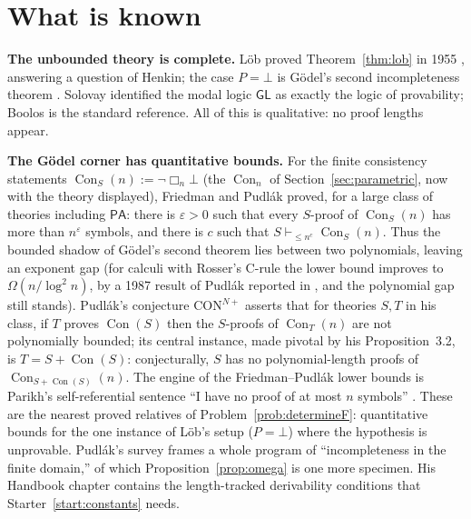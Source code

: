 \documentclass[11pt]{amsart}
\theoremstyle{plain}
\theoremstyle{definition}
\newcommand{\PA}{\mathsf{PA}}
\newcommand{\GL}{\mathsf{GL}}
\newcommand{\Con}{\operatorname{Con}}
\begin{document}
\section{What is known}
\label{sec:known}

\textbf{The unbounded theory is complete.} L\"ob proved Theorem~\ref{thm:lob} in 1955 \cite{lob1955}, answering a question of Henkin; the case $P = \bot$ is G\"odel's second incompleteness theorem \cite{godel1931}. Solovay \cite{solovay1976} identified the modal logic $\GL$ as exactly the logic of provability; Boolos \cite{boolos1993} is the standard reference. All of this is qualitative: no proof lengths appear.

\textbf{The G\"odel corner has quantitative bounds.} For the finite consistency statements $\Con_S(n) := \neg\Box_n\bot$ (the $\Con_n$ of Section~\ref{sec:parametric}, now with the theory displayed), Friedman \cite{friedman1979} and Pudl\'ak \cite{pudlak1986} proved, for a large class of theories including $\PA$: there is $\varepsilon > 0$ such that every $S$-proof of $\Con_S(n)$ has more than $n^{\varepsilon}$ symbols, and there is $c$ such that $S \vdash_{\le n^c} \Con_S(n)$. Thus the bounded shadow of G\"odel's second theorem lies between two polynomials, leaving an exponent gap (for calculi with Rosser's C-rule the lower bound improves to $\Omega(n/\log^2 n)$, by a 1987 result of Pudl\'ak reported in \cite{pudlak2017}, and the polynomial gap still stands). Pudl\'ak's conjecture $\mathrm{CON}^{N+}$ \cite{pudlak2017} asserts that for theories $S, T$ in his class, if $T$ proves $\Con(S)$ then the $S$-proofs of $\Con_T(n)$ are not polynomially bounded; its central instance, made pivotal by his Proposition~3.2, is $T = S + \Con(S)$: conjecturally, $S$ has no polynomial-length proofs of $\Con_{S+\Con(S)}(n)$. The engine of the Friedman--Pudl\'ak lower bounds is Parikh's self-referential sentence ``I have no proof of at most $n$ symbols'' \cite{parikh1971}. These are the nearest proved relatives of Problem~\ref{prob:determineF}: quantitative bounds for the one instance of L\"ob's setup ($P = \bot$) where the hypothesis is unprovable. Pudl\'ak's survey \cite{pudlak2017} frames a whole program of ``incompleteness in the finite domain,'' of which Proposition~\ref{prop:omega} is one more specimen. His Handbook chapter \cite{pudlak1998} contains the length-tracked derivability conditions that Starter~\ref{start:constants} needs.
\end{document}
